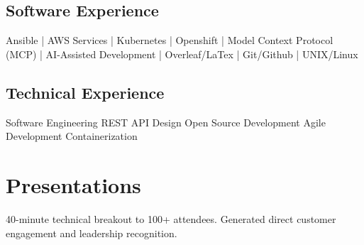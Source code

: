 \documentclass[]{deedy-resume-reversed}
\begin{document}
\begin{minipage}[t]{0.29\textwidth}
\subsection{Software Experience}
Ansible | AWS Services | \newline
Kubernetes | Openshift | \newline
Model Context Protocol (MCP) | \newline
AI-Assisted Development |\newline
Overleaf/LaTex |\newline
Git/Github | UNIX/Linux 
\sectionsep

\subsection{Technical Experience}
Software Engineering \newline
REST API Design \newline
Open Source Development \newline
Agile Development \newline 
Containerization %
\sectionsep

\section{Presentations}
  
\vspace{2mm}

\vspace{2mm}

40-minute technical breakout to 100+ attendees. Generated direct customer engagement and leadership recognition.
\vspace{5mm}

\vspace{2mm}

\vspace{2mm}


\end{minipage}
\end{document}
